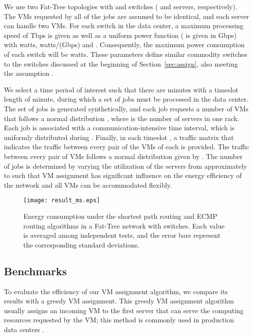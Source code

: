 \documentclass[journal,single-space,two column,twoside,10pt]{IEEEtran}
\begin{document}
We use two Fat-Tree topologies with  and  switches ( and  servers, respectively). The VMs requested by all of the jobs are assumed to be identical, and each server can handle two VMs. For each switch in the data center, a maximum processing speed of  Tbps is given as well as a uniform power function  ( is given in Gbps) with  watts,  watts/(Gbps) and . Consequently, the maximum power consumption of each switch will be  watts. These parameters define similar commodity switches to the switches discussed at the beginning of Section~\ref{sec:assign}, also meeting the assumption .

We select a time period of interest  such that there are  minutes with a timeslot length of  minute, during which a set of jobs  must be processed in the data center. The set of jobs  is generated synthetically, and each job requests a number of VMs that follows a normal distribution , where  is the number of servers in one rack. Each job is associated with a communication-intensive time interval, which is uniformly distributed during . Finally, in each timeslot , a traffic matrix  that indicates the traffic between every pair of the VMs of each  is provided. The traffic between every pair of VMs follows a normal distribution given by . The number of jobs is determined by varying the utilization of the servers from approximately  to  such that VM assignment has significant influence on the energy efficiency of the network and all VMs can be accommodated flexibly. 

\begin{figure}[!t]
	\centering
	\texttt{[image: result\_ms.eps]}
	\caption{\label{fig:result:ms}Energy consumption under the shortest path routing and ECMP routing algorithms in a Fat-Tree network with  switches. Each value is averaged among  independent tests, and the error bars represent the corresponding standard deviations.}
\end{figure}


\subsection{Benchmarks}

To evaluate the efficiency of our VM assignment algorithm, we compare its results with a greedy VM assignment. This greedy VM assignment algorithm usually assigns an incoming VM to the first server that can serve the computing resources requested by the VM; this method is commonly used in production data centers \cite{Meng_Pappas-2010}.
\end{document}
